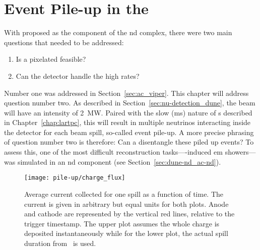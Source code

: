 \section{Event Pile-up in the }
\label{sec:dune-nd_pile-up}

With \AC{} proposed as  the \lar{} component of the \dune{} \gls{nd} complex, there were two main questions that needed to be addressed:
\begin{enumerate}
	\item Is a pixelated \lartpc{} feasible?
	\item Can the \lar{} detector handle the high rates?
\end{enumerate}
Number one was addressed in Section~\ref{sec:ac_viper}.
This chapter will address question number two.
As described in Section~\ref{sec:nu-detection_dune}, the \dune{} beam will have an intensity of \SI{2}{\mega\watt}.
Paired with the slow (\si{\milli\second}) nature of \lartpc{}s described in Chapter~\ref{chap:lartpc}, this will result in multiple neutrinos interacting inside the detector for each beam spill, so-called event pile-up.
A more precise phrasing of question number two is therefore: Can a \lartpc{} disentangle these piled up events?
To assess this, one of the most difficult reconstruction tasks---\Pgpz-induced \gls{em} showers---was simulated in an \AC{} \gls{nd} component (see Section~\ref{sec:dune-nd_ac-nd}).

\begin{figure}[htb]
	\centering
	\texttt{[image: pile-up/charge\_flux]}
	\caption[Average current collected for one spill as a function of time]{%
		Average current collected for one spill as a function of time.
		The current is given in arbitrary but equal units for both plots.
		Anode and cathode are represented by the vertical red lines, relative to the trigger timestamp.
		The upper plot assumes the whole charge is deposited instantaneously while for the lower plot, the actual spill duration from~\cite{dune2} is used.
	}
	\label{fig:dune-nd_charge-flux}
\end{figure}

